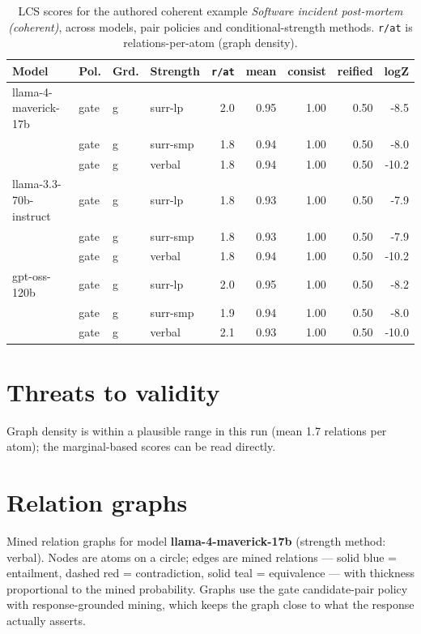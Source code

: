 \documentclass[11pt]{article}
\begin{document}
\begin{table}[htbp]
\centering
\footnotesize
\setlength{\tabcolsep}{4pt}
\caption{LCS scores for the authored coherent example \emph{Software incident post-mortem (coherent)}, across models, pair policies and conditional-strength methods. \texttt{r/at} is relations-per-atom (graph density).}
\label{tab:coherent}
\begin{tabular}{llllrrrrr}
\toprule
\textbf{Model} & \textbf{Pol.} & \textbf{Grd.} & \textbf{Strength} & \texttt{r/at} & mean & consist & reified & logZ \\
\midrule
llama-4-maverick-17b & gate & g & surr-lp & 2.0 & 0.95 & 1.00 & 0.50 & -8.5 \\
 & gate & g & surr-smp & 1.8 & 0.94 & 1.00 & 0.50 & -8.0 \\
 & gate & g & verbal & 1.8 & 0.94 & 1.00 & 0.50 & -10.2 \\
\midrule
llama-3.3-70b-instruct & gate & g & surr-lp & 1.8 & 0.93 & 1.00 & 0.50 & -7.9 \\
 & gate & g & surr-smp & 1.8 & 0.93 & 1.00 & 0.50 & -7.9 \\
 & gate & g & verbal & 1.8 & 0.94 & 1.00 & 0.50 & -10.2 \\
\midrule
gpt-oss-120b & gate & g & surr-lp & 2.0 & 0.95 & 1.00 & 0.50 & -8.2 \\
 & gate & g & surr-smp & 1.9 & 0.94 & 1.00 & 0.50 & -8.0 \\
 & gate & g & verbal & 2.1 & 0.93 & 1.00 & 0.50 & -10.0 \\
\bottomrule
\end{tabular}
\end{table}


\section{Threats to validity}

Graph density is within a plausible range in this run (mean 1.7 relations per atom); the marginal-based scores can be read directly.

\section{Relation graphs}\label{sec:graphs}

Mined relation graphs for model \textbf{llama-4-maverick-17b} (strength method: verbal). Nodes are atoms on a circle; edges are mined relations --- solid blue = entailment, dashed red = contradiction, solid teal = equivalence --- with thickness proportional to the mined probability. Graphs use the gate candidate-pair policy with response-grounded mining, which keeps the graph close to what the response actually asserts.
\end{document}
